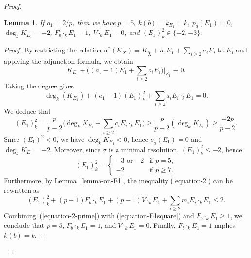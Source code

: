 \documentclass[reqno,oneside]{amsart}
\newtheorem{lemma}[theorem]{Lemma}
\theoremstyle{definition}
\theoremstyle{plain}
\numberwithin{equation}{section}
\begin{document}
\begin{proof}
\begin{lemma}\label{lemma-E1-numerics}
  If $a_1 = 2/p$, then we have $p=5$, $k(b)=k_{E_1}=k$, $p_a(E_1)=0$, $\deg_k K_{E_1}=-2$, $F_b\cdot_k E_1 = 1$, $V\cdot_k E_1 =0$,
  and $(E_1)^2_k \in \{-2,-3\}$.
\end{lemma}
\begin{proof}
By restricting the relation $\sigma^*(K_X) = K_{\widetilde{X}} + a_1E_1 + \sum_{i\geq 2} a_i E_i$ to $E_1$ and applying the adjunction formula, we obtain
$$K_{E_1} + \bigl((a_1-1)E_1 + \sum_{i\geq 2} a_i E_i\bigr)\big|_{E_1} \equiv 0.$$
Taking the degree gives
\begin{equation}\label{equation-4}
  \deg_{k} (K_{E_1}) + (a_1-1)(E_1)^2_{k} + \sum_{i\geq 2} a_i E_i\cdot_{k} E_1 = 0.
\end{equation}
We deduce that 
$$(E_1)^2_k = \frac{p}{p-2}\bigl(\deg_k K_{E_1} + \sum_{i\geq 2} a_i E_i\cdot_k E_1\bigr) \geq \frac{p}{p-2}(\deg_k K_{E_1}) \geq \frac{-2p}{p-2}.$$
Since $(E_1)^2<0$, we have $\deg_k K_{E_1} <0$, hence $p_a(E_1) = 0$ and $\deg_k K_{E_1}=-2$.
Moreover, since $\sigma$ is a minimal resolution, $(E_1)^2_k \le -2$, hence
\begin{equation}\label{equation-E1square}
     (E_1)^2_k = 
     \begin{cases}
        -3 \text{ or } {-2} & \text{if } p = 5,\\
        -2 & \text{if } p \ge 7.
     \end{cases}
\end{equation}
Furthermore, by Lemma~\ref{lemma-on-E1}, the inequality (\ref{equation-2}) can be rewritten as
  \begin{equation}\label{equation-2-prime}
    (E_1)^2_k + (p-1)F_b\cdot_k E_1 +(p-1) V\cdot_k E_1 + \sum_{i\geq 2} m_i E_i\cdot_k E_1 \leq 2.
  \end{equation}
  Combining~(\ref{equation-2-prime}) with (\ref{equation-E1square}) and $F_b\cdot_k E_1 \ge 1$, we conclude that $p=5$, $F_b\cdot_k E_1 = 1$, and $V\cdot_k E_1 =0$.
Finally, $F_b \cdot_k E_1 = 1$ implies $k(b) = k$.
\end{proof}



\end{proof}
\end{document}
